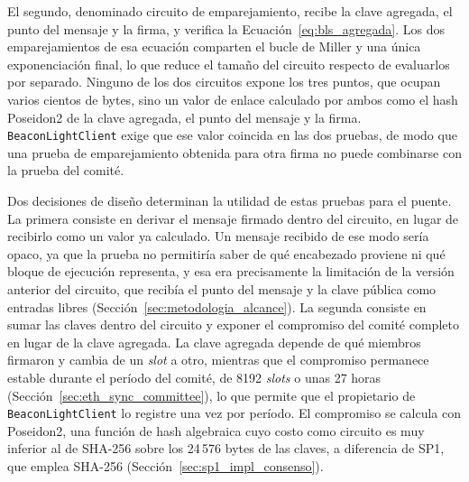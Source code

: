 El segundo, denominado circuito de emparejamiento, recibe la clave agregada, el punto del mensaje
y la firma, y verifica la Ecuación~\eqref{eq:bls_agregada}. Los dos emparejamientos de esa
ecuación comparten el bucle de Miller y una única exponenciación final, lo que reduce el tamaño
del circuito respecto de evaluarlos por separado. Ninguno de los dos circuitos expone los tres
puntos, que ocupan varios cientos de bytes, sino un valor de enlace calculado por ambos como el
hash Poseidon2 de la clave agregada, el punto del mensaje y la firma. \texttt{BeaconLightClient}
exige que ese valor coincida en las dos pruebas, de modo que una prueba de emparejamiento
obtenida para otra firma no puede combinarse con la prueba del comité.

Dos decisiones de diseño determinan la utilidad de estas pruebas para el puente. La primera
consiste en derivar el mensaje firmado dentro del circuito, en lugar de recibirlo como un valor
ya calculado. Un mensaje recibido de ese modo sería opaco, ya que la prueba no permitiría saber de
qué encabezado proviene ni qué bloque de ejecución representa, y esa era precisamente la
limitación de la versión anterior del circuito, que recibía el punto del mensaje y la clave
pública como entradas libres (Sección~\ref{sec:metodologia_alcance}). La segunda consiste en sumar
las claves dentro del circuito y exponer el compromiso del comité completo en lugar de la clave
agregada. La clave agregada depende de qué miembros firmaron y cambia de un \textit{slot} a otro,
mientras que el compromiso permanece estable durante el período del comité, de 8192
\textit{slots} o unas 27 horas (Sección~\ref{sec:eth_sync_committee}), lo que permite que el
propietario de \texttt{BeaconLightClient} lo registre una vez por período. El compromiso se calcula
con Poseidon2, una función de hash algebraica cuyo costo como circuito es muy inferior al de
SHA-256 sobre los 24\,576 bytes de las claves, a diferencia de SP1, que emplea SHA-256
(Sección~\ref{sec:sp1_impl_consenso}).

